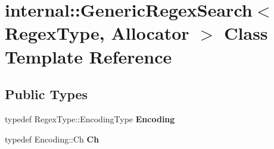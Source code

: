 \hypertarget{classinternal_1_1GenericRegexSearch}{}\section{internal\+:\+:Generic\+Regex\+Search$<$ Regex\+Type, Allocator $>$ Class Template Reference}
\label{classinternal_1_1GenericRegexSearch}
\subsection*{Public Types}
\begin{DoxyCompactItemize}
\item 
typedef Regex\+Type\+::\+Encoding\+Type {\bfseries Encoding}\hypertarget{classinternal_1_1GenericRegexSearch_a7b1f81c580c33200c83e1529c2fdbf54}{}\label{classinternal_1_1GenericRegexSearch_a7b1f81c580c33200c83e1529c2fdbf54}

\item 
typedef Encoding\+::\+Ch {\bfseries Ch}\hypertarget{classinternal_1_1GenericRegexSearch_a966f3a62fc838b5e9350f4c6a624d9a1}{}\label{classinternal_1_1GenericRegexSearch_a966f3a62fc838b5e9350f4c6a624d9a1}

\end{DoxyCompactItemize}
